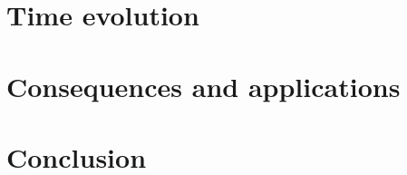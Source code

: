 \documentclass[12pt, a4paper]{report}
\newcommand\PT{\(\mathcal{PT}\)}
\begin{document}





\chapter{Time evolution}\label{TEv}



\chapter{Consequences and applications}\label{Consq}







\chapter{Conclusion}\label{Conclusion}



\end{document}
